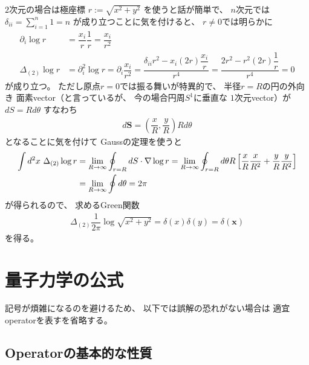 $2$次元の場合は極座標
$r := \sqrt{x^2 + y^2}$
を使うと話が簡単で、
$n$次元では
$\displaystyle
\delta_{ii}
= \sum_{i=1}^n 1
= n$
が成り立つことに気を付けると、
$r \neq 0$では明らかに
\begin{subequations}
\begin{align}
    \partial_i
    \log r
&=
    \dfrac{x_i}{r}
    \dfrac{1}{r}
=
    \dfrac{x_i}{r^2}
\\
    \Delta_{(2)}
    \log r
&=
    \partial_i^2
    \log r
=
    \partial_i
    \dfrac{x_i}{r^2}
=
    \dfrac{
        \delta_{ii} r^2
    -
        x_i (2 r)
        \dfrac{x_i}{r}
    }{r^4}
=
    \dfrac{
        2 r^2
    -
        r^2 (2 r)
        \dfrac{1}{r}
    }{r^4}
= 0
\end{align}
\end{subequations}
が成り立つ。
ただし原点$r = 0$では振る舞いが特異的で、
半径$r = R$の円の外向き
面素vector（と言っているが、
今の場合円周$S^1$に垂直な
$1$次元vector）が
$dS = R d \theta$
すなわち
\begin{align}
    d \bm{S}
=
    \left(
        \dfrac{x}{R}
    ,
        \dfrac{y}{R}
    \right)
    R d \theta
\end{align}
となることに気を付けて
Gaussの定理を使うと
\begin{align}
    \int d^2 x\ 
        \Delta_{(2)}
        \log r
&=
    \lim_{R \to \infty}
    \oint_{r = R} d \bm{S}
        \cdot
        \nabla
        \log r
=
    \lim_{R \to \infty}
    \oint_{r = R}
        d \theta
    R
    \left[
        \dfrac{x}{R}
        \dfrac{x}{R^2}
    +
        \dfrac{y}{R}
        \dfrac{y}{R^2}
    \right]
\notag\\&
=
    \lim_{R \to \infty}
    \oint
        d \theta
=
    2 \pi
\end{align}
が得られるので、
求めるGreen関数
\begin{align}
    \Delta_{(2)}
    \dfrac{1}{2 \pi}
    \log \sqrt{x^2 + y^2}
=
    \delta(x)
    \delta(y)
=
    \delta(\bm{x})
\end{align}
を得る。

\newpage
\section{量子力学の公式}

記号が煩雑になるのを避けるため、
以下では誤解の恐れがない場合は
適宜operatorを表す$\hat{}$を省略する。

\subsection{Operatorの基本的な性質}

